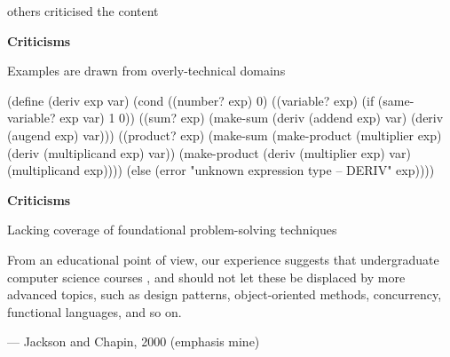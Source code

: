
\begin{frame}

\Large \centering
others criticised the content
\end{frame}


\begin{frame}[fragile]

\begin{center}
{\bf Criticisms}
\end{center}
\begin{center}
Examples are drawn from overly-technical domains

\nl

{\scriptsize
\begin{schemecode}
(define (deriv exp var)
  (cond ((number? exp) 0)
        ((variable? exp)
         (if (same-variable? exp var) 1 0))
        ((sum? exp)
         (make-sum (deriv (addend exp) var)
                   (deriv (augend exp) var)))
        ((product? exp)
         (make-sum
           (make-product (multiplier exp)
                         (deriv (multiplicand exp) var))
           (make-product (deriv (multiplier exp) var)
                         (multiplicand exp))))
        (else
         (error "unknown expression type -- DERIV" exp))))
\end{schemecode}
}
\end{center}
\end{frame}


\begin{frame}

\begin{center}
{\bf Criticisms}
\end{center}
\begin{center}
Lacking coverage of foundational problem-solving techniques
\end{center}

\begin{block}{}
From an educational point of view, our experience suggests that undergraduate \\
computer science courses 
, and should not let these be displaced by more advanced topics,
such as design patterns, object-oriented methods, concurrency, functional languages,
and so on.

\nl

--- Jackson and Chapin, 2000
(emphasis mine)
\end{block}
\end{frame}









